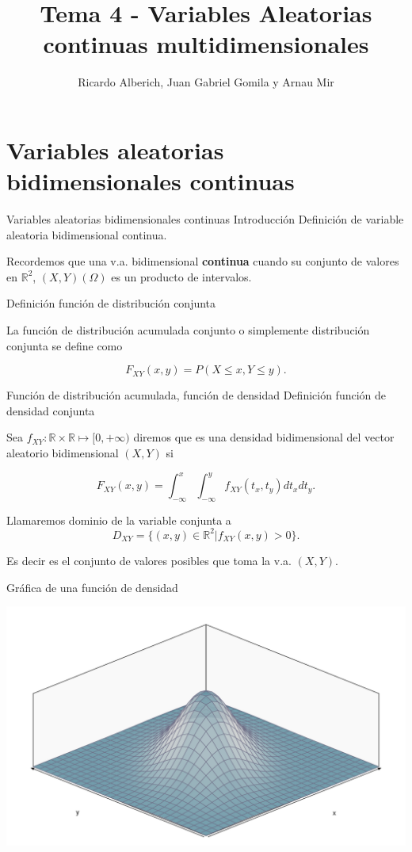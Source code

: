 \documentclass[
  ignorenonframetext,
]{beamer}
\title{Tema 4 - Variables Aleatorias continuas multidimensionales}
\author{Ricardo Alberich, Juan Gabriel Gomila y Arnau Mir}
\date{}
\begin{document}
\frame{\titlepage}

\hypertarget{variables-aleatorias-bidimensionales-continuas}{%
\section{Variables aleatorias bidimensionales
continuas}\label{variables-aleatorias-bidimensionales-continuas}}

\begin{frame}{Variables aleatorias bidimensionales continuas
Introducción}
\protect\hypertarget{variables-aleatorias-bidimensionales-continuas-introducciuxf3n}{}
Definición de variable aleatoria bidimensional continua.

Recordemos que una v.a. bidimensional \textbf{continua} cuando su
conjunto de valores en \(\mathbb{R}^2\), \((X,Y)(\Omega)\) es un
producto de intervalos.

Definición función de distribución conjunta

La función de distribución acumulada conjunto o simplemente distribución
conjunta se define como

\[F_{XY}(x,y)=P(X\leq x,Y\leq y).\]
\end{frame}

\begin{frame}{Función de distribución acumulada, función de densidad}
\protect\hypertarget{funciuxf3n-de-distribuciuxf3n-acumulada-funciuxf3n-de-densidad}{}
Definición función de densidad conjunta

Sea \(f_{XY}: \mathbb{R}\times \mathbb{R}\mapsto [0,+\infty)\) diremos
que es una densidad bidimensional del vector aleatorio bidimensional
\((X,Y)\) si

\[F_{XY}(x,y)=\int_{-\infty}^{x}\int_{-\infty}^{y} f_{XY}(t_x,t_y) dt_xdt_y.\]

Llamaremos dominio de la variable conjunta a
\[D_{XY}=\{(x,y)\in \mathbb{R}^2 | f_{XY}(x,y)>0\}.\]

Es decir es el conjunto de valores posibles que toma la v.a. \((X,Y)\).
\end{frame}

\begin{frame}{Gráfica de una función de densidad}
\protect\hypertarget{gruxe1fica-de-una-funciuxf3n-de-densidad}{}
\begin{center}\includegraphics{Tema_4_VA_Continuas_multidimensionales_files/figure-beamer/unnamed-chunk-1-1} \end{center}
\end{frame}
\end{document}
